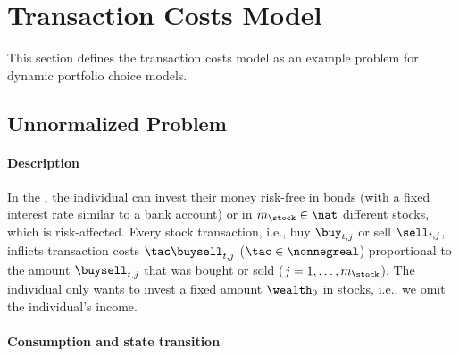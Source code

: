 \section{Transaction Costs Model}
\label{sec:83problem}


\noindent
This section defines the transaction costs model as an example problem for
dynamic portfolio choice models.



\subsection{Unnormalized Problem}
\label{sec:831unnormalized}

\paragraph{Description}

In the  \cite{Schober18Solving},
the individual can invest their money risk-free in bonds
(with a fixed interest rate similar to a bank account)
or in $m_{\stock} \in \nat$ different stocks, which is risk-affected.
Every stock transaction,
i.e., buy $\buy_{t,j}$ or sell $\sell_{t,j}$,
inflicts transaction costs $\tac \buysell_{t,j}$ ($\tac \in \nonnegreal$)
proportional to the amount $\buysell_{t,j}$ that was bought or sold
($j = 1, \dotsc, m_{\stock}$).
The individual only wants to invest a fixed
amount $\wealth_0$ in stocks, i.e., we omit the individual's income.

\paragraph{Consumption and state transition}

